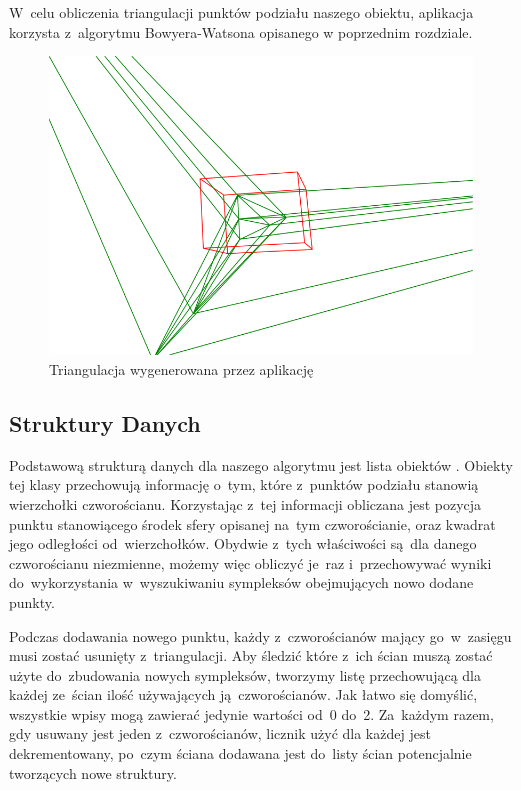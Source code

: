 \documentclass[skorowidz,autorrok,backref,xodstep,oswiadczenie]{wmimgr}
\begin{document}
W~celu obliczenia triangulacji punktów podziału naszego obiektu, aplikacja korzysta z~algorytmu Bowyera-Watsona opisanego w poprzednim rozdziale.

\begin{figure}[ht!]
\centering
\includegraphics[width=140mm]{images/app1_1.png}
\caption{Triangulacja wygenerowana przez aplikację}
\label{apptriangulation}
\end{figure}

\subsection{Struktury Danych}

Podstawową strukturą danych dla naszego algorytmu jest lista obiektów . Obiekty tej klasy przechowują informację o~tym, które z~punktów podziału stanowią wierzchołki czworościanu. Korzystając z~tej informacji obliczana jest pozycja punktu stanowiącego środek sfery opisanej na~tym czworościanie, oraz kwadrat jego odległości od~wierzchołków. Obydwie z~tych właściwości są~dla danego czworościanu niezmienne, możemy więc obliczyć je~raz i~przechowywać wyniki do~wykorzystania w~wyszukiwaniu sympleksów obejmujących nowo dodane punkty.

Podczas dodawania nowego punktu, każdy z~czworościanów mający go~w~zasięgu musi zostać usunięty z~triangulacji. Aby śledzić które z~ich ścian muszą zostać użyte do~zbudowania nowych sympleksów, tworzymy listę przechowującą dla każdej ze~ścian ilość używających ją~czworościanów. Jak łatwo się domyślić, wszystkie wpisy mogą zawierać jedynie wartości od~0 do~2. Za~każdym razem, gdy usuwany jest jeden z~czworościanów, licznik użyć dla każdej jest dekrementowany, po~czym ściana dodawana jest do~listy ścian potencjalnie tworzących nowe struktury.
\end{document}
